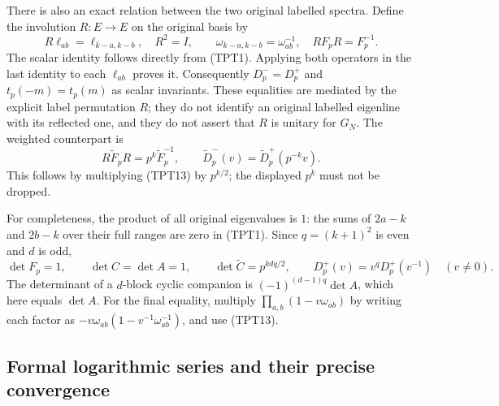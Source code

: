 There is also an exact relation between the two original labelled
spectra. Define the involution $R:E\to E$ on the original basis by
\begin{equation}\tag{TPT13}
 R\ell_{ab}=\ell_{k-a,k-b},\quad R^2=I,\qquad
 \omega_{k-a,k-b}=\omega_{ab}^{-1},\quad
 RF_pR=F_p^{-1}.
\end{equation}
The scalar identity follows directly from (TPT1). Applying both
operators in the last identity to each $\ell_{ab}$ proves it.
Consequently $D_p^-=D_p^+$ and $t_p(-m)=t_p(m)$ as scalar invariants.
These equalities are mediated by the explicit label permutation $R$;
they do not identify an original labelled eigenline with its reflected
one, and they do not assert that $R$ is unitary for $G_N$.
The weighted counterpart is
\begin{equation}\tag{TPT14}
 R\widetilde F_pR=p^k\widetilde F_p^{-1},\qquad
 \widetilde D_p^-(v)=\widetilde D_p^+(p^{-k}v).
\end{equation}
This follows by multiplying (TPT13) by $p^{k/2}$; the displayed
$p^k$ must not be dropped.

For completeness, the product of all original eigenvalues is $1$:
the sums of $2a-k$ and $2b-k$ over their full ranges are zero in
(TPT1). Since $q=(k+1)^2$ is even and $d$ is odd,
\begin{equation}\tag{TPT15}
 \det F_p=1,\qquad \det C=\det A=1,\qquad
 \det\widetilde C=p^{kdq/2},\qquad
 D_p^+(v)=v^qD_p^+(v^{-1})\quad(v\ne0).
\end{equation}
The determinant of a $d$-block cyclic companion is
$(-1)^{(d-1)q}\det A$, which here equals $\det A$.
For the final equality, multiply
$\prod_{a,b}(1-v\omega_{ab})$ by writing each factor as
$-v\omega_{ab}(1-v^{-1}\omega_{ab}^{-1})$, and use (TPT13).

\subsection{Formal logarithmic series and their precise convergence}

